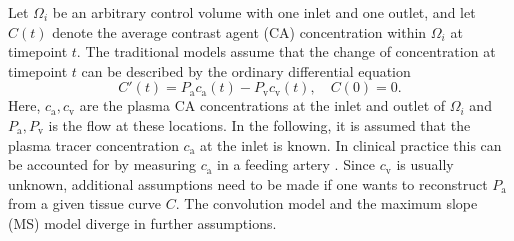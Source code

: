 \documentclass[journal,twocolumn]{IEEEtran}
\newcommand{\ca}{c_\mathrm{a}}
\newcommand{\cout}{c_{\mathrm{v}}}
\newcommand{\Pa}{P_{\mathrm{a}}}
\newcommand{\Pout}{P_{\mathrm{v}}}
\begin{document}
	Let $\Omega_i$ be an arbitrary control volume with one inlet and one outlet, and let $C(t)$ denote the average contrast agent (CA) concentration within $\Omega_i$ at timepoint $t$.
	The traditional models assume that the change of concentration at timepoint $t$ can be described by the ordinary differential equation 
	\begin{equation}\label{eq:classicgeneral}
		C'(t) = \Pa\ca(t) - \Pout\cout(t), \quad C(0) = 0.
	\end{equation}
	Here, $\ca,\cout$ are the plasma CA concentrations at the inlet and outlet of $\Omega_i$ and $\Pa,\Pout$ is the flow at these locations.
	In the following, it is assumed that the plasma tracer concentration $\ca$ at the inlet is known.
	In clinical practice this can be accounted for by measuring $\ca$ in a feeding artery \cite{ostergaard96}.
	Since $\cout$ is usually unknown, additional assumptions need to be made if one wants to reconstruct $\Pa$ from a given tissue curve $C$. The convolution model and the maximum slope (MS) model diverge in further assumptions.

	

\end{document}
